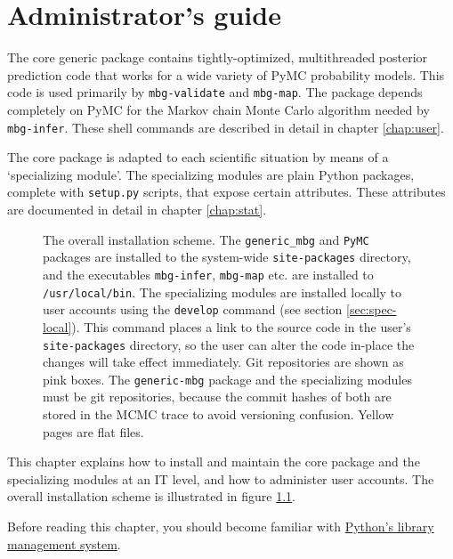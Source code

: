 \chapter{Administrator's guide} 
\label{chap:admin} 

The core generic package contains tightly-optimized, multithreaded posterior prediction code that works for a wide variety of PyMC probability models. This code is used primarily by \texttt{mbg-validate} and \texttt{mbg-map}. The package depends completely on PyMC for the Markov chain Monte Carlo algorithm needed by \texttt{mbg-infer}. These shell commands are described in detail in chapter \ref{chap:user}.

The core package is adapted to each scientific situation by means of a `specializing module'. The specializing modules are plain Python packages, complete with \texttt{setup.py} scripts, that expose certain attributes. These attributes are documented in detail in chapter \ref{chap:stat}.

\begin{figure}[hhh]
    \begin{center}
    \end{center}
    \caption{The overall installation scheme. The \texttt{generic\_mbg} and \texttt{PyMC} packages are installed to the system-wide \texttt{site-packages} directory, and the executables \texttt{mbg-infer}, \texttt{mbg-map} etc. are installed to \texttt{/usr/local/bin}. The specializing modules are installed locally to user accounts using the \texttt{develop} command (see section \ref{sec:spec-local}). This command places a link to the source code in the user's \texttt{site-packages} directory, so the user can alter the code in-place the changes will take effect immediately. Git repositories are shown as pink boxes. The \texttt{generic-mbg} package and the specializing modules must be git repositories, because the commit hashes of both are stored in the MCMC trace to avoid versioning confusion. Yellow pages are flat files.   }
    \label{fig:installation}
\end{figure}

\bigskip
This chapter explains how to install and maintain the core package and the specializing modules at an IT level, and how to administer user accounts. The overall installation scheme is illustrated in figure \ref{fig:installation}.

\bigskip
Before reading this chapter, you should become familiar with \href{http://docs.python.org/install/index.html}{Python's library management system}.

